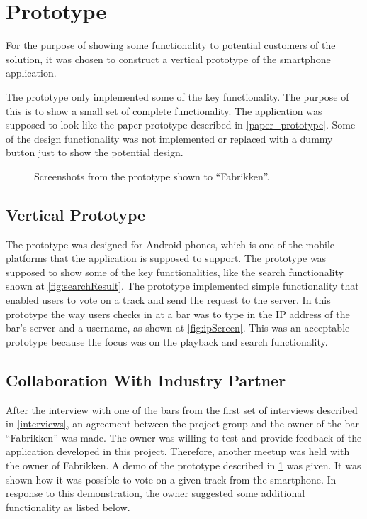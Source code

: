 \section{Prototype}
\label{sec:prototype}
For the purpose of showing some functionality to potential customers of the solution, it was chosen to construct a vertical prototype of the smartphone application.

The prototype only implemented some of the key functionality. The purpose of this is to show a small set of complete functionality. The application was supposed to look like the paper prototype described in \cref{paper_prototype}. Some of the design functionality was not implemented or replaced with a dummy button just to show the potential design.

\begin{figure}[hbtp]
  \centering
  \caption{Screenshots from the prototype shown to \enquote{Fabrikken}.}
\end{figure}

\subsection{Vertical Prototype}
\label{sub:vertical_prototype}

The prototype was designed for Android phones, which is one of the mobile platforms that the application is supposed to support. The prototype was supposed to show some of the key functionalities, like the search functionality shown at \cref{fig:searchResult}. The prototype implemented simple functionality that enabled users to vote on a track and send the request to the server. In this prototype the way users checks in at a bar was to type in the IP address of the bar's server and a username, as shown at \cref{fig:ipScreen}. This was an acceptable prototype because the focus was on the playback and search functionality.

\subsection{Collaboration With Industry Partner}
\label{sub:fabrikken}
After the interview with one of the bars from the first set of interviews described in \cref{interviews}, an agreement between the project group and the owner of the bar \enquote{Fabrikken} was made. The owner was willing to test and provide feedback of the application developed in this project. Therefore, another meetup was held with the owner of Fabrikken. A demo of the prototype described in \cref{sec:prototype} was given. It was shown how it was possible to vote on a given track from the smartphone. In response to this demonstration, the owner suggested some additional functionality as listed below.

